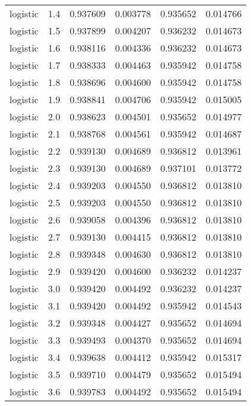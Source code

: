 \begin{tabular}{lrrrrr}
logistic &        1.4 &    0.937609 &   0.003778 &   0.935652 &  0.014766 \\
logistic &        1.5 &    0.937899 &   0.004207 &   0.936232 &  0.014673 \\
logistic &        1.6 &    0.938116 &   0.004336 &   0.936232 &  0.014673 \\
logistic &        1.7 &    0.938333 &   0.004463 &   0.935942 &  0.014758 \\
logistic &        1.8 &    0.938696 &   0.004600 &   0.935942 &  0.014758 \\
logistic &        1.9 &    0.938841 &   0.004706 &   0.935942 &  0.015005 \\
logistic &        2.0 &    0.938623 &   0.004501 &   0.935652 &  0.014977 \\
logistic &        2.1 &    0.938768 &   0.004561 &   0.935942 &  0.014687 \\
logistic &        2.2 &    0.939130 &   0.004689 &   0.936812 &  0.013961 \\
logistic &        2.3 &    0.939130 &   0.004689 &   0.937101 &  0.013772 \\
logistic &        2.4 &    0.939203 &   0.004550 &   0.936812 &  0.013810 \\
logistic &        2.5 &    0.939203 &   0.004550 &   0.936812 &  0.013810 \\
logistic &        2.6 &    0.939058 &   0.004396 &   0.936812 &  0.013810 \\
logistic &        2.7 &    0.939130 &   0.004415 &   0.936812 &  0.013810 \\
logistic &        2.8 &    0.939348 &   0.004630 &   0.936812 &  0.013810 \\
logistic &        2.9 &    0.939420 &   0.004600 &   0.936232 &  0.014237 \\
logistic &        3.0 &    0.939420 &   0.004492 &   0.936232 &  0.014237 \\
logistic &        3.1 &    0.939420 &   0.004492 &   0.935942 &  0.014543 \\
logistic &        3.2 &    0.939348 &   0.004427 &   0.935652 &  0.014694 \\
logistic &        3.3 &    0.939493 &   0.004370 &   0.935652 &  0.014694 \\
logistic &        3.4 &    0.939638 &   0.004412 &   0.935942 &  0.015317 \\
logistic &        3.5 &    0.939710 &   0.004479 &   0.935652 &  0.015494 \\
logistic &        3.6 &    0.939783 &   0.004492 &   0.935652 &  0.015494 \\

\end{tabular}
